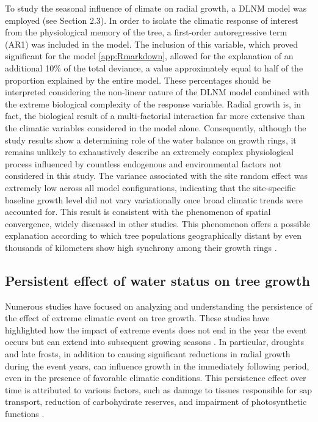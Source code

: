 \documentclass[12pt, a4paper]{article}
\begin{document}
To study the seasonal influence of climate on radial growth, a DLNM model was employed (see Section 2.3). In order to isolate the climatic response of interest from the physiological memory of the tree, a first-order autoregressive term (AR1) was included in the model. The inclusion of this variable, which proved significant for the model \cref{app:Rmarkdown}, allowed for the explanation of an additional 10\% of the total deviance, a value approximately equal to half of the proportion explained by the entire model. These percentages should be interpreted considering the non-linear nature of the DLNM model combined with the extreme biological complexity of the response variable. Radial growth is, in fact, the biological result of a multi-factorial interaction far more extensive than the climatic variables considered in the model alone. Consequently, although the study results show a determining role of the water balance on growth rings, it remains unlikely to exhaustively describe an extremely complex physiological process influenced by countless endogenous and environmental factors not considered in this study. The variance associated with the site random effect was extremely low across all model configurations, indicating that the site-specific baseline growth level did not vary variationally once broad climatic trends were accounted for. This result is consistent with the phenomenon of spatial convergence, widely discussed in other studies. This phenomenon offers a possible explanation according to which tree populations geographically distant by even thousands of kilometers show high synchrony among their growth rings \parencite{vieira2021, shestakova2016}.


\subsection{Persistent effect of water status on tree growth}

Numerous studies have focused on analyzing and understanding the persistence of the effect of extreme climatic event on tree growth. These studies have highlighted how the impact of extreme events does not end in the year the event occurs but can extend into subsequent growing seasons \parencite{huang2018}. In particular, droughts and late frosts, in addition to causing significant reductions in radial growth during the event years, can influence growth in the immediately following period, even in the presence of favorable climatic conditions. This persistence effect over time is attributed to various factors, such as damage to tissues responsible for sap transport, reduction of carbohydrate reserves, and impairment of photosynthetic functions \parencite{mirabel2023, sala2012}.
\end{document}
